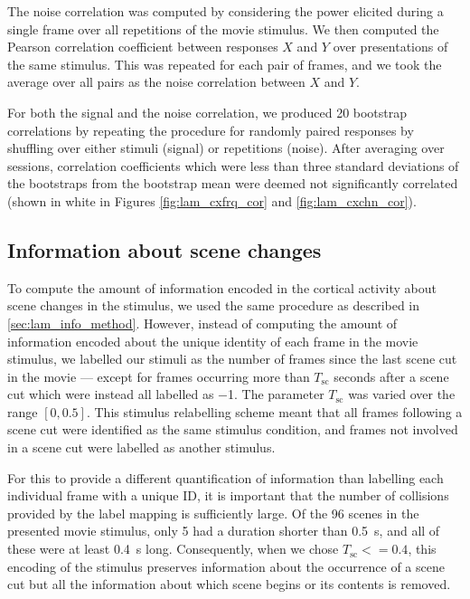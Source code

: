 The noise correlation was computed by considering the power elicited during a single frame over all repetitions of the movie stimulus.
We then computed the Pearson correlation coefficient between responses $X$ and $Y$ over presentations of the same stimulus.
This was repeated for each pair of frames, and we took the average over all pairs as the noise correlation between $X$ and $Y$.

For both the signal and the noise correlation, we produced \num{20} bootstrap correlations by repeating the procedure for randomly paired responses by shuffling over either stimuli (signal) or repetitions (noise).
After averaging over sessions, correlation coefficients which were less than three standard deviations of the bootstraps from the bootstrap mean were deemed not significantly correlated (shown in white in Figures \ref{fig:lam_cxfrq_cor} and \ref{fig:lam_cxchn_cor}).


\subsection{Information about scene changes}
\label{sec:lam_scnchg_method}

To compute the amount of information encoded in the cortical activity about scene changes in the stimulus, we used the same procedure as described in \autoref{sec:lam_info_method}.
However, instead of computing the amount of information encoded about the unique identity of each frame in the movie stimulus, we labelled our stimuli as the number of frames since the last scene cut in the movie --- except for frames occurring more than $T_\text{sc}$ seconds after a scene cut which were instead all labelled as \num{-1}.
The parameter $T_\text{sc}$ was varied over the range $[0, 0.5]$.
This stimulus relabelling scheme meant that all frames following a scene cut were identified as the same stimulus condition, and frames not involved in a scene cut were labelled as another stimulus.

For this to provide a different quantification of information than labelling each individual frame with a unique ID, it is important that the number of collisions provided by the label mapping is sufficiently large.
Of the \num{96} scenes in the presented movie stimulus, only \num{5} had a duration shorter than \SI{0.5}{\second}, and all of these were at least \SI{0.4}{\second} long.
Consequently, when we chose $T_\text{sc} <= 0.4$, this encoding of the stimulus preserves information about the occurrence of a scene cut but all the information about which scene begins or its contents is removed.

